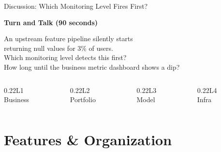 \documentclass[aspectratio=169, 12pt]{beamer}
\begin{document}
\begin{frame}{Discussion: Which Monitoring Level Fires First?}

\centering
\vspace{0.5cm}
{\large\bfseries Turn and Talk \textcolor{midgray}{(90 seconds)}}

\vspace{0.45cm}
{\large An upstream feature pipeline silently starts\\
returning null values for 3\% of users.\\[0.25cm]
\alert{Which monitoring level detects this first?\\
How long until the business metric dashboard shows a dip?}}

\vspace{0.45cm}
\begin{columns}[c]
  \begin{column}{0.22\textwidth}\centering\small L1\\Business\end{column}
  \begin{column}{0.22\textwidth}\centering\small L2\\Portfolio\end{column}
  \begin{column}{0.22\textwidth}\centering\small L3\\Model\end{column}
  \begin{column}{0.22\textwidth}\centering\small L4\\Infra\end{column}
\end{columns}

\end{frame}

\section{Features \& Organization}
\end{document}
